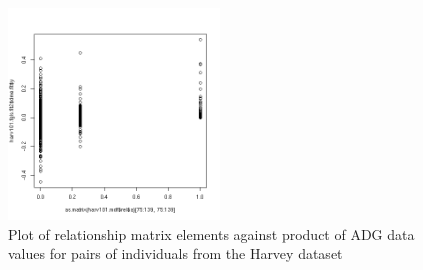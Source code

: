 %

\begin{figure}[ht]
  \centering
  \includegraphics[width=0.5\textwidth]{relvsactual.png}
  \caption{Plot of relationship matrix elements against product of ADG data values for pairs
           of individuals from the Harvey dataset} 
  \label{fig:rva}
\end{figure}

%

